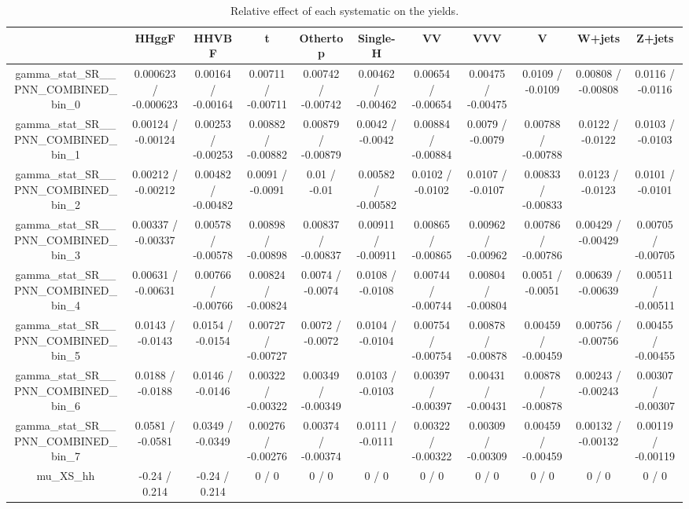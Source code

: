 \documentclass[10pt]{article}
\begin{document}
\begin{table}[htbp]
\begin{center}
\begin{tabular}{|c|c|c|c|c|c|c|c|c|c|c|}
\hline 
      & HHggF      & HHVBF      & t      & Othertop      & Single-H      & VV      & VVV      & V      & W+jets      & Z+jets \\ 
\hline 
  gamma_stat_SR__PNN_COMBINED_bin_0 & 0.000623 / -0.000623 & 0.00164 / -0.00164 & 0.00711 / -0.00711 & 0.00742 / -0.00742 & 0.00462 / -0.00462 & 0.00654 / -0.00654 & 0.00475 / -0.00475 & 0.0109 / -0.0109 & 0.00808 / -0.00808 & 0.0116 / -0.0116 \\ 
  gamma_stat_SR__PNN_COMBINED_bin_1 & 0.00124 / -0.00124 & 0.00253 / -0.00253 & 0.00882 / -0.00882 & 0.00879 / -0.00879 & 0.0042 / -0.0042 & 0.00884 / -0.00884 & 0.0079 / -0.0079 & 0.00788 / -0.00788 & 0.0122 / -0.0122 & 0.0103 / -0.0103 \\ 
  gamma_stat_SR__PNN_COMBINED_bin_2 & 0.00212 / -0.00212 & 0.00482 / -0.00482 & 0.0091 / -0.0091 & 0.01 / -0.01 & 0.00582 / -0.00582 & 0.0102 / -0.0102 & 0.0107 / -0.0107 & 0.00833 / -0.00833 & 0.0123 / -0.0123 & 0.0101 / -0.0101 \\ 
  gamma_stat_SR__PNN_COMBINED_bin_3 & 0.00337 / -0.00337 & 0.00578 / -0.00578 & 0.00898 / -0.00898 & 0.00837 / -0.00837 & 0.00911 / -0.00911 & 0.00865 / -0.00865 & 0.00962 / -0.00962 & 0.00786 / -0.00786 & 0.00429 / -0.00429 & 0.00705 / -0.00705 \\ 
  gamma_stat_SR__PNN_COMBINED_bin_4 & 0.00631 / -0.00631 & 0.00766 / -0.00766 & 0.00824 / -0.00824 & 0.0074 / -0.0074 & 0.0108 / -0.0108 & 0.00744 / -0.00744 & 0.00804 / -0.00804 & 0.0051 / -0.0051 & 0.00639 / -0.00639 & 0.00511 / -0.00511 \\ 
  gamma_stat_SR__PNN_COMBINED_bin_5 & 0.0143 / -0.0143 & 0.0154 / -0.0154 & 0.00727 / -0.00727 & 0.0072 / -0.0072 & 0.0104 / -0.0104 & 0.00754 / -0.00754 & 0.00878 / -0.00878 & 0.00459 / -0.00459 & 0.00756 / -0.00756 & 0.00455 / -0.00455 \\ 
  gamma_stat_SR__PNN_COMBINED_bin_6 & 0.0188 / -0.0188 & 0.0146 / -0.0146 & 0.00322 / -0.00322 & 0.00349 / -0.00349 & 0.0103 / -0.0103 & 0.00397 / -0.00397 & 0.00431 / -0.00431 & 0.00878 / -0.00878 & 0.00243 / -0.00243 & 0.00307 / -0.00307 \\ 
  gamma_stat_SR__PNN_COMBINED_bin_7 & 0.0581 / -0.0581 & 0.0349 / -0.0349 & 0.00276 / -0.00276 & 0.00374 / -0.00374 & 0.0111 / -0.0111 & 0.00322 / -0.00322 & 0.00309 / -0.00309 & 0.00459 / -0.00459 & 0.00132 / -0.00132 & 0.00119 / -0.00119 \\ 
  mu_XS_hh & -0.24 / 0.214 & -0.24 / 0.214 & 0 / 0 & 0 / 0 & 0 / 0 & 0 / 0 & 0 / 0 & 0 / 0 & 0 / 0 & 0 / 0 \\ 
\hline 
\end{tabular} 
\caption{Relative effect of each systematic on the yields.} 
\end{center} 
\end{table} 
\end{document}
